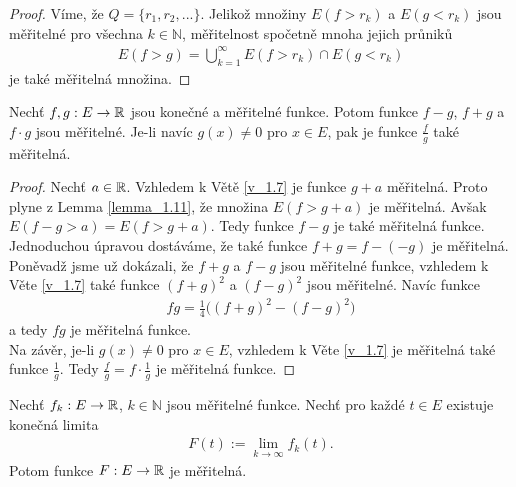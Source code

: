 \begin{proof}
Víme, že $Q=\{r_1,r_2,...\}$. Jelikož množiny $E(f>r_k)$ a $E(g<r_k)$ jsou měřitelné pro všechna $k \in \mathbb{N}$, měřitelnost spočetně mnoha jejich pr\r unik\r u
\begin{align*}
E(f>g)=\bigcup \limits _{k=1}^{\infty} E(f>r_k) \cap E(g<r_k)
\end{align*}
je také měřitelná množina.
\end{proof}



\begin{theorem}
Nechť $f,g: E \to \mathbb{R}$ jsou konečné a měřitelné funkce. Potom funkce $f-g$, $f+g$ a $f \cdot g$ jsou měřitelné. 
Je-li navíc $g(x) \neq 0$ pro $x \in E$, pak je funkce $\frac{f}{g}$ také  měřitelná.
\end{theorem}

\begin{proof}
Nechť $a \in \mathbb{R}$. Vzhledem k Větě \ref{v_1.7} je funkce $g+a$ měřitelná. 
Proto plyne z Lemma \ref{lemma_1.11}, že množina $E(f>g+a)$ je měřitelná. 
Avšak $E(f-g>a)=E(f>g+a)$. Tedy funkce $f-g$ je také měřitelná funkce. \\
Jednoduchou úpravou dostáváme, že také funkce $f+g=f-(-g)$ je měřitelná. \\
Poněvadž jsme už dokázali, že $f+g$ a $f-g$ jsou měřitelné funkce, vzhledem k Věte \ref{v_1.7} také funkce $(f+g)^2$ a $(f-g)^2$ jsou měřitelné. 
Navíc funkce 
\begin{align*}
fg=\frac{1}{4}\Big((f+g)^2-(f-g)^2\Big)
\end{align*}
a tedy $fg$ je měřitelná funkce. \\
Na závěr, je-li $g(x) \neq 0$ pro $x \in E$, vzhledem k Věte \ref{v_1.7} je měřitelná také funkce $\frac{1}{g}$. Tedy $\frac{f}{g}=f \cdot \frac{1}{g}$ je měřitelná funkce.
\end{proof}

\begin{theorem}
Nechť $f_k:E \to \mathbb{R}$, $k \in \mathbb{N}$ jsou měřitelné funkce. Nechť pro každé $t \in E$ existuje konečná limita 
\begin{align}
F(t):=\lim \limits _{k \to \infty} f_k(t).
\label{vztah_1.1}
\end{align}
Potom funkce $F:E \to \mathbb{R}$ je měřitelná.
\label{v_1.13}
\end{theorem}

